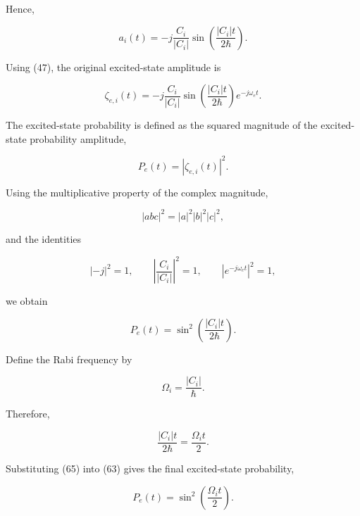 \documentclass[12pt,a4paper]{article}
\begin{document}
Hence,

\begin{equation}
a_i(t)
=
-j\frac{C_i}{|C_i|}
\sin\left(\frac{|C_i|t}{2\hbar}\right).
\tag{58}
\end{equation}

Using (47), the original excited-state amplitude is

\begin{equation}
\zeta_{e,i}(t)
=
-j\frac{C_i}{|C_i|}
\sin\left(\frac{|C_i|t}{2\hbar}\right)e^{-j\omega_e t}.
\tag{59}
\end{equation}

The excited-state probability is defined as the squared magnitude of the excited-state probability amplitude,

\begin{equation}
P_e(t)=|\zeta_{e,i}(t)|^2.
\tag{60}
\end{equation}

Using the multiplicative property of the complex magnitude,

\begin{equation}
|abc|^2=|a|^2|b|^2|c|^2,
\tag{61}
\end{equation}

and the identities

\begin{equation}
|-j|^2=1,
\qquad
\left|\frac{C_i}{|C_i|}\right|^2=1,
\qquad
|e^{-j\omega_e t}|^2=1,
\tag{62}
\end{equation}

we obtain

\begin{equation}
P_e(t)
=
\sin^2\left(\frac{|C_i|t}{2\hbar}\right).
\tag{63}
\end{equation}

Define the Rabi frequency by

\begin{equation}
\boxed{
\Omega_i=\frac{|C_i|}{\hbar}
}.
\tag{64}
\end{equation}

Therefore,

\begin{equation}
\frac{|C_i|t}{2\hbar}=\frac{\Omega_i t}{2}.
\tag{65}
\end{equation}

Substituting (65) into (63) gives the final excited-state probability,

\begin{equation}
\boxed{
P_e(t)=\sin^2\left(\frac{\Omega_i t}{2}\right)
}.
\tag{66}
\end{equation}
\end{document}
